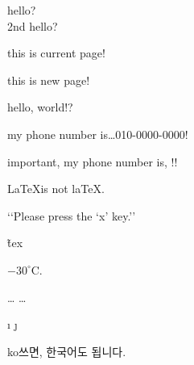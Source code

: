 \documentclass{article}
\begin{document}
hello? \\
2nd hello? \newline

this is current page! \newpage

this is new page! \newline


h\-e\-l\-l\-o, world!?

my phone number is\dots \mbox{010-0000-0000}!

important, my phone number is, !!


\LaTeX is not la\TeX.

\fbox{\today}

‘‘Please press the ‘x’ key.’’

\~tex

$-30^{\circ}\mathrm{C}$.

\dots
\ldots

\i
\j

ko 쓰면, 한국어도 됩니다.
\end{document}
